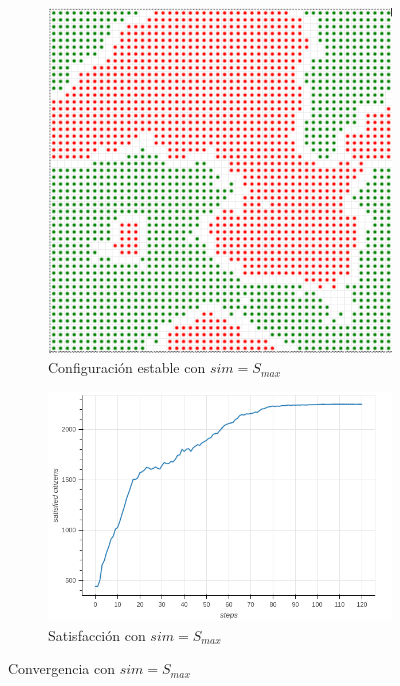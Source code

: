 \documentclass{article}
\begin{document}
\begin{itemize}
    \begin{figure}
    \centering
    \begin{subfigure}{0.4 \textwidth}
        \includegraphics[width=\textwidth]{imgs/conv_state75.png}
        \caption{Configuración estable con $sim = S_{max}$}
        \label{fig:state-conv75}
    \end{subfigure}
    \quad
    \begin{subfigure}{0.5\textwidth}
        \includegraphics[width=\textwidth]{imgs/conv_chart75.png}
        \caption{Satisfacción con $sim = S_{max}$}
        \label{fig:chart-conv75}
    \end{subfigure}
    \caption{Convergencia con $sim=S_{max}$}
    \label{fig:conv75}
    \end{figure}


\end{itemize}
\end{document}
